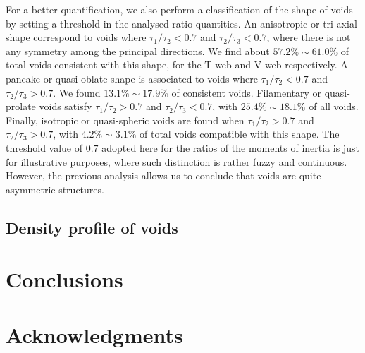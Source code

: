 \documentclass[a4,useAMS,usenatbib,usegraphicx]{latex/mn2e}
\begin{document}
For a better quantification, we also perform a classification of the shape 
of voids by setting a threshold in the analysed ratio quantities. An 
anisotropic or tri-axial shape correspond to voids where $\tau_1/\tau_2 < 
0.7$ and $\tau_2/\tau_3 < 0.7$, where there is not any symmetry among the
principal directions. We find about $57.2\% \sim 61.0\%$ of total voids 
consistent with this shape, for the T-web and V-web respectively. A 
pancake or quasi-oblate shape is associated to voids where $\tau_1/\tau_2 
< 0.7$ and $\tau_2/\tau_3 > 0.7$. We found $13.1\% \sim 17.9\%$ of 
consistent voids. Filamentary or quasi-prolate voids satisfy $\tau_1/\tau_2 
> 0.7$ and $\tau_2/\tau_3 < 0.7$, with $25.4\% \sim 18.1\%$ of all voids.
Finally, isotropic or quasi-spheric voids are found when $\tau_1/\tau_2 
> 0.7$ and $\tau_2/\tau_3 > 0.7$, with $4.2\% \sim 3.1\%$ of total voids 
compatible with this shape. The threshold value of $0.7$ adopted here for
the ratios of the moments of inertia is just for illustrative purposes, 
where such distinction is rather fuzzy and continuous. However, the 
previous analysis allows us to conclude that voids are quite asymmetric 
structures.



\subsection{Density profile of voids}
\label{subsec:density_voids}



\section{Conclusions}
\label{sec:conclusions}


\section*{Acknowledgments}  



 
\end{document}
